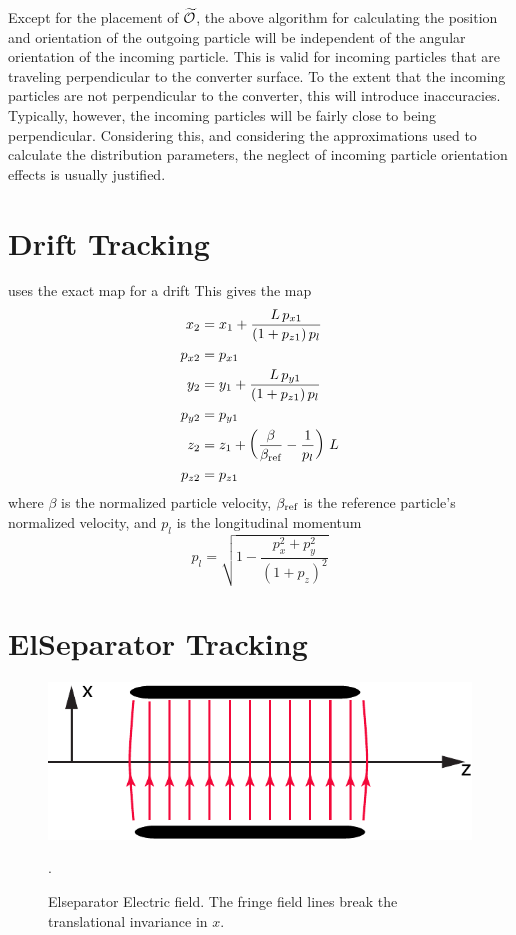 Except for the placement of $\widetilde{{\cal O}}$, the above algorithm for calculating the position and
orientation of the outgoing particle will be independent of the angular orientation of the incoming
particle. This is valid for incoming particles that are traveling perpendicular to the converter
surface. To the extent that the incoming particles are not perpendicular to the converter, this will
introduce inaccuracies. Typically, however, the incoming particles will be fairly close to being
perpendicular. Considering this, and considering the approximations used to calculate the
distribution parameters, the neglect of incoming particle orientation effects is usually justified.

\section{Drift Tracking}
\label{s:drift.std}

\bmad uses the exact map for a drift
This gives the map
\begin{align}
  x_2    &= x_1 + \frac{L \, p_{x1}}{(1 + p_{z1}) \, p_l} \nonumber \\
  p_{x2} &= p_{x1}  \nonumber \\
  y_2    &= y_1 + \frac{L \, p_{y1}}{(1 + p_{z1}) \, p_l} \nonumber \\
  p_{y2} &= p_{y1}  \\
  z_2    &= z_1 + \left( \frac{\beta}{\beta_{\text{ref}}} - \frac{1}{p_l} \right) \, L \nonumber \\
  p_{z2} &= p_{z1} \nonumber
\end{align}
where $\beta$ is the normalized particle velocity, $\beta_{\text{ref}}$ is 
the reference particle's normalized velocity, and $p_l$ is the
longitudinal momentum
\begin{equation}
  p_l = \sqrt{1 - \frac{p_x^2 + p_y^2}{(1 + p_z)^2}}
\end{equation}

\section{ElSeparator Tracking}
\label{s:elsep.std}

\begin{figure}[tb]
  \centering
  \includegraphics[width=5in]{elseparator.pdf}
  \caption[ElSeparator electric field.]
  {
Elseparator Electric field. The fringe field lines break the
translational invariance in $x$.
  }
  \label{f:elsep}.
\end{figure}

